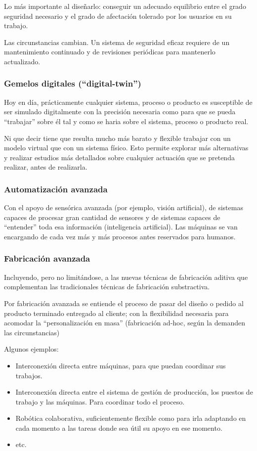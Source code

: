 \documentclass[spanish,12pt,a4paper,final,oneside]{book}
\begin{document}
Lo más importante al diseñarlo: conseguir un adecuado equilibrio entre el grado seguridad necesario y el grado de afectación tolerado por los usuarios en su trabajo.

Las circunstancias cambian. Un sistema de seguridad eficaz requiere de un mantenimiento continuado y de revisiones periódicas para mantenerlo actualizado.

\subsubsection*{Gemelos digitales (``digital-twin'')}
Hoy en día, prácticamente cualquier sistema, proceso o producto es susceptible de ser simulado digitalmente con la precisión necesaria como para que se pueda ``trabajar'' sobre él tal y como se haria sobre el sistema, proceso o producto real.

Ni que decir tiene que resulta mucho más barato y flexible trabajar con un modelo virtual que con un sistema físico. Esto permite explorar más alternativas y realizar estudios más detallados sobre cualquier actuación que se pretenda realizar, antes de realizarla.

\subsubsection*{Automatización avanzada}
Con el apoyo de sensórica avanzada (por ejemplo, visión artificial), de sistemas capaces de procesar gran cantidad de sensores y de sistemas capaces de ``entender'' toda esa información (inteligencia artificial). Las máquinas se van encargando de cada vez más y más procesos antes reservados para humanos. 

\subsubsection*{Fabricación avanzada}
Incluyendo, pero no limitándose, a las nuevas técnicas de fabricación aditiva que complementan las tradicionales técnicas de fabricación substractiva.

Por fabricación avanzada se entiende el proceso de pasar del diseño o pedido al producto terminado entregado al cliente; con la flexibilidad necesaria para acomodar la ``personalización en masa'' (fabricación ad-hoc, según la demanden las circunstancias)

Algunos ejemplos:
\begin{itemize}
\item Interconexión directa entre máquinas, para que puedan coordinar sus trabajos.
\item Interconexión directa entre el sistema de gestión de producción, los puestos de trabajo y las máquinas. Para coordinar todo el proceso.
\item Robótica colaborativa, suficientemente flexible como para irla adaptando en cada momento a las tareas donde sea útil su apoyo en ese momento.
\item etc.
\end{itemize}
\end{document}
